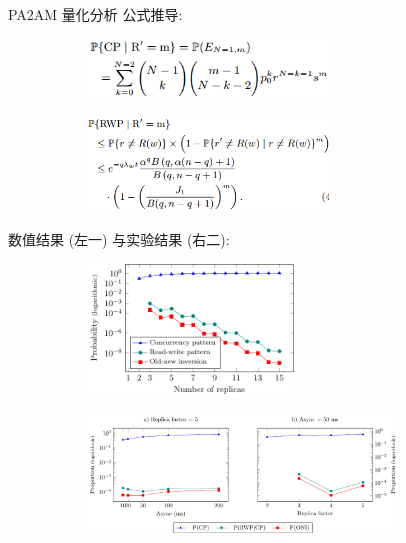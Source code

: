 \begin{frame}{PA2AM 量化分析}
  公式推导:
  \begin{figure}
	\begin{subfigure}{0.50\textwidth}
	  \centering
	  \includegraphics[width = 0.70\textwidth]{figures/cp.png}
	\end{subfigure}%
	\begin{subfigure}{0.50\textwidth}
	  \centering
	  \includegraphics[width = 0.70\textwidth]{figures/rwp.png}
	\end{subfigure}
  \end{figure}

  \vspace{0.10cm}

  数值结果 (左一) 与实验结果 (右二): 
  \begin{figure}
	\begin{subfigure}{0.45\textwidth}
	  \centering
	  \includegraphics[width = 0.60\textwidth]{figures/oni-pgfplot.pdf}
	\end{subfigure}%
	\begin{subfigure}{0.55\textwidth}
	  \centering
	  \includegraphics[width = 0.90\textwidth]{figures/experiment-oni-pgfplot.pdf}
	\end{subfigure}
  \end{figure}
\end{frame}
